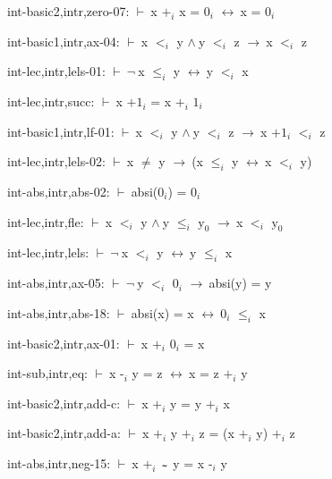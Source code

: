 \documentclass[a4paper]{article}
\newcommand{\tildesym}{\raisebox{-4pt}{\bf\~{}}}
\newcommand{\Fol}{\mbox{$\vdash\ $}}
\newcommand{\Not}{\mbox{$\neg\ $}}
\newcommand{\And}{\mbox{$\wedge\ $}}
\newcommand{\Imp}{\mbox{$\rightarrow\ $}}
\newcommand{\Equiv}{\mbox{$\leftrightarrow\ $}}
\begin{document}
int-basic2,intr,zero-07: 
 \Fol x $\mbox{+}_{i}$ x = $\mbox{0}_{i}$ \Equiv x = $\mbox{0}_{i}$



int-basic1,intr,ax-04: 
 \Fol x $\mbox{$<$}_{i}$ y \And y $\mbox{$<$}_{i}$ z \Imp x $\mbox{$<$}_{i}$ z



int-lec,intr,lels-01: 
 \Fol \Not x $\mbox{$\le$}_{i}$ y \Equiv y $\mbox{$<$}_{i}$ x



int-lec,intr,succ: 
 \Fol x $\mbox{+1}_{i}$ = x $\mbox{+}_{i}$ $\mbox{1}_{i}$



int-basic1,intr,lf-01: 
 \Fol x $\mbox{$<$}_{i}$ y \And y $\mbox{$<$}_{i}$ z \Imp x $\mbox{+1}_{i}$ $\mbox{$<$}_{i}$ z



int-lec,intr,lels-02: 
 \Fol x $\neq$ y \Imp (x $\mbox{$\le$}_{i}$ y \Equiv x $\mbox{$<$}_{i}$ y)



int-abs,intr,abs-02: 
 \Fol absi($\mbox{0}_{i}$) = $\mbox{0}_{i}$



int-lec,intr,fle: 
 \Fol x $\mbox{$<$}_{i}$ y \And y $\mbox{$\le$}_{i}$ $\mbox{y}_{0}$ \Imp x $\mbox{$<$}_{i}$ $\mbox{y}_{0}$



int-lec,intr,lels: 
 \Fol \Not x $\mbox{$<$}_{i}$ y \Equiv y $\mbox{$\le$}_{i}$ x



int-abs,intr,ax-05: 
 \Fol \Not y $\mbox{$<$}_{i}$ $\mbox{0}_{i}$ \Imp absi(y) = y



int-abs,intr,abs-18: 
 \Fol absi(x) = x \Equiv $\mbox{0}_{i}$ $\mbox{$\le$}_{i}$ x



int-basic2,intr,ax-01: 
 \Fol x $\mbox{+}_{i}$ $\mbox{0}_{i}$ = x



int-sub,intr,eq: 
 \Fol x $\mbox{-}_{i}$ y = z \Equiv x = z $\mbox{+}_{i}$ y



int-basic2,intr,add-c: 
 \Fol x $\mbox{+}_{i}$ y = y $\mbox{+}_{i}$ x



int-basic2,intr,add-a: 
 \Fol x $\mbox{+}_{i}$ y $\mbox{+}_{i}$ z = (x $\mbox{+}_{i}$ y) $\mbox{+}_{i}$ z



int-abs,intr,neg-15: 
 \Fol x $\mbox{+}_{i}$ $\tildesym$ y = x $\mbox{-}_{i}$ y
\end{document}
